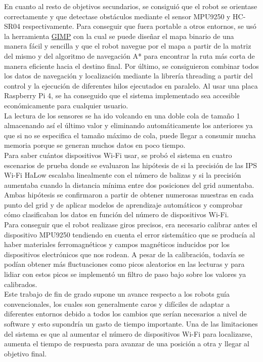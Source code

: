 En cuanto al resto de objetivos secundarios, se consiguió que el robot se orientase correctamente y que detectase obstáculos mediante el sensor MPU9250 y HC-SR04 respectivamente. Para conseguir que fuera portable a otros entornos, se usó la herramienta \hyperlink{GIMP}{GIMP} con la cual se puede diseñar el mapa binario de una manera fácil y sencilla y que el robot navegue por el mapa a partir de la matriz del mismo y del algoritmo de navegación A* para encontrar la ruta más corta de manera eficiente hacia el destino final. Por último, se consiguieron combinar todos los datos de navegación y localización mediante la librería threading a partir del control y la ejecución de diferentes hilos ejecutados en paralelo. Al usar una placa Raspberry Pi 4, se ha conseguido que el sistema implementado sea accesible económicamente para cualquier usuario.\\


La lectura de los sensores se ha ido volcando en una doble cola de tamaño 1 almacenando así el último valor y eliminando automáticamente los anteriores ya que si no se especifica el tamaño máximo de cola, puede llegar a consumir mucha memoria porque se generan muchos datos en poco tiempo.\\


Para saber cuántos dispositivos Wi-Fi usar, se probó el sistema en cuatro escenarios de prueba donde se evaluaron las hipótesis de si la precisión de las IPS Wi-Fi HaLow escalaba linealmente con el número de balizas y si la precisión aumentaba cuando la distancia mínima entre dos posiciones del grid aumentaba. Ambas hipótesis se confirmaron a partir de obtener numerosas muestras en cada punto del grid y de aplicar modelos de aprendizaje automáticos y comprobar cómo clasificaban los datos en función del número de dispositivos Wi-Fi.\\

Para conseguir que el robot realizase giros precisos, era necesario calibrar antes el dispositivo MPU9250 tendiendo en cuenta el error sistemático que se producía al haber materiales ferromagnéticos y campos magnéticos inducidos por los dispositivos electrónicos que nos rodean. A pesar de la calibración, todavía se podían obtener más fluctuaciones como picos aleatorios en las lecturas y para lidiar con estos picos se implementó un filtro de paso bajo sobre los valores ya calibrados.\\

Este trabajo de fin de grado supone un avance respecto a los robots guía convencionales, los cuales son generalmente caros y difíciles de adaptar a diferentes entornos debido a todos los cambios que serían necesarios a nivel de software y esto supondría un gasto de tiempo importante. Una de las limitaciones del sistema es que al aumentar el número de dispositivos Wi-Fi para localizarse, aumenta el tiempo de respuesta para avanzar de una posición a otra y llegar al objetivo final.\\


